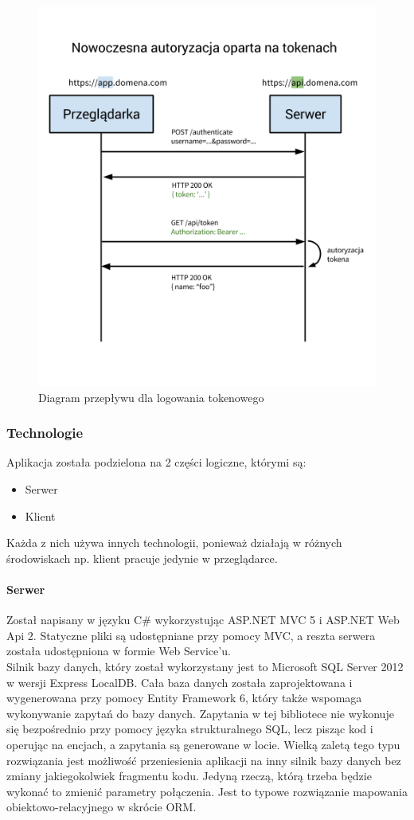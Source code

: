 \documentclass[10pt,titlepage]{article}
\begin{document}
\begin{figure}[H]
  \centering
  \includegraphics[scale=0.355]{images/tokenAuth2.png}
  \caption{Diagram przepływu dla logowania tokenowego}
\end{figure}
\subsubsection{Technologie}
Aplikacja została podzielona na 2 części logiczne, którymi są:
\begin{itemize}
  \item Serwer
  \item Klient
\end{itemize}
Każda z nich używa innych technologii, ponieważ działają w różnych środowiskach np. klient pracuje jedynie w przeglądarce.
\paragraph{Serwer}
Został napisany w języku C\# wykorzystując ASP.NET MVC 5 i ASP.NET Web Api 2. Statyczne pliki są udostępniane przy pomocy MVC, a reszta serwera została udostępniona w formie Web Service'u.\\ Silnik bazy danych, który został wykorzystany jest to Microsoft SQL Server 2012 w wersji Express LocalDB. Cała baza danych została zaprojektowana i wygenerowana przy pomocy Entity Framework 6, który także wspomaga wykonywanie zapytań do bazy danych. Zapytania w tej bibliotece nie wykonuje się bezpośrednio przy pomocy języka strukturalnego SQL, lecz pisząc kod i operując na encjach, a zapytania są generowane w locie. Wielką zaletą tego typu rozwiązania jest możliwość przeniesienia aplikacji na inny silnik bazy danych bez zmiany jakiegokolwiek fragmentu kodu. Jedyną rzeczą, którą trzeba będzie wykonać to zmienić parametry połączenia. Jest to typowe rozwiązanie mapowania obiektowo-relacyjnego w skrócie ORM.
\end{document}
